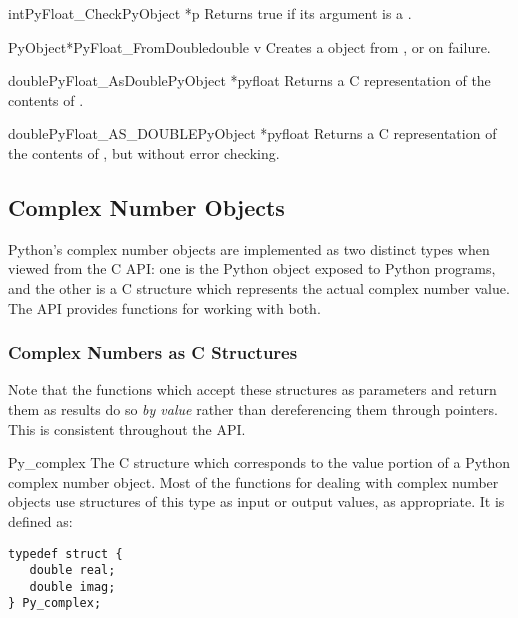 \documentclass{manual}
\begin{document}
\begin{cfuncdesc}{int}{PyFloat_Check}{PyObject *p}
Returns true if its argument is a .
\end{cfuncdesc}

\begin{cfuncdesc}{PyObject*}{PyFloat_FromDouble}{double v}
Creates a  object from , or \NULL{} on
failure.
\end{cfuncdesc}

\begin{cfuncdesc}{double}{PyFloat_AsDouble}{PyObject *pyfloat}
Returns a C  representation of the contents of .
\end{cfuncdesc}

\begin{cfuncdesc}{double}{PyFloat_AS_DOUBLE}{PyObject *pyfloat}
Returns a C  representation of the contents of
, but without error checking.
\end{cfuncdesc}


\subsection{Complex Number Objects \label{complexObjects}}

Python's complex number objects are implemented as two distinct types
when viewed from the C API:  one is the Python object exposed to
Python programs, and the other is a C structure which represents the
actual complex number value.  The API provides functions for working
with both.

\subsubsection{Complex Numbers as C Structures}

Note that the functions which accept these structures as parameters
and return them as results do so \emph{by value} rather than
dereferencing them through pointers.  This is consistent throughout
the API.

\begin{ctypedesc}{Py_complex}
The C structure which corresponds to the value portion of a Python
complex number object.  Most of the functions for dealing with complex
number objects use structures of this type as input or output values,
as appropriate.  It is defined as:

\begin{verbatim}
typedef struct {
   double real;
   double imag;
} Py_complex;
\end{verbatim}
\end{ctypedesc}
\end{document}
